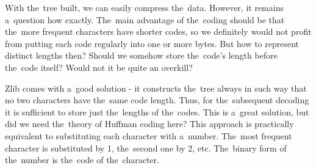 With the~tree built, we can easily compress the~data. However, it remains a~question how exactly. The~main advantage of the~coding should be that the~more frequent characters have shorter codes, so we definitely would not profit from putting each code regularly into one or more bytes. But how to represent distinct lengths then? Should we somehow store the~code's length before the~code itself? Would not it be quite an overkill? 

Zlib comes with a~good solution - it constructs the~tree always in such way that no two characters have the~same code length. Thus, for the~subsequent decoding it is sufficient to store just the~lengths of the~codes. This is a~great solution, but did we need the~theory of Huffman coding here? This approach is practically equivalent to substituting each character with a~number. The~most frequent character is substituted by 1, the~second one by 2, etc. The~binary form of the~number is the~code of the~character. 


